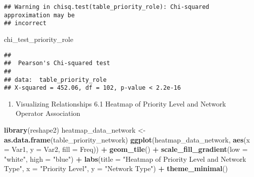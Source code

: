 \documentclass[
]{article}
\newenvironment{Shaded}{\begin{snugshade}}{\end{snugshade}}
\newcommand{\AttributeTok}[1]{\textcolor[rgb]{0.13,0.29,0.53}{#1}}
\newcommand{\CommentTok}[1]{\textcolor[rgb]{0.56,0.35,0.01}{\textit{#1}}}
\newcommand{\FunctionTok}[1]{\textcolor[rgb]{0.13,0.29,0.53}{\textbf{#1}}}
\newcommand{\NormalTok}[1]{#1}
\newcommand{\OtherTok}[1]{\textcolor[rgb]{0.56,0.35,0.01}{#1}}
\newcommand{\SpecialCharTok}[1]{\textcolor[rgb]{0.81,0.36,0.00}{\textbf{#1}}}
\newcommand{\StringTok}[1]{\textcolor[rgb]{0.31,0.60,0.02}{#1}}
\providecommand{\tightlist}{%
  \setlength{\itemsep}{0pt}\setlength{\parskip}{0pt}}
\begin{document}
\begin{Shaded}
\end{Shaded}

\begin{verbatim}
## Warning in chisq.test(table_priority_role): Chi-squared approximation may be
## incorrect
\end{verbatim}

\begin{Shaded}
\begin{Highlighting}[]
\NormalTok{chi\_test\_priority\_role}
\end{Highlighting}
\end{Shaded}

\begin{verbatim}
## 
##  Pearson's Chi-squared test
## 
## data:  table_priority_role
## X-squared = 452.06, df = 102, p-value < 2.2e-16
\end{verbatim}

\begin{enumerate}
\def\labelenumi{\arabic{enumi}.}
\setcounter{enumi}{5}
\tightlist
\item
  Visualizing Relationships 6.1 Heatmap of Priority Level and Network
  Operator Association
\end{enumerate}

\begin{Shaded}
\begin{Highlighting}[]
\FunctionTok{library}\NormalTok{(reshape2)}
\NormalTok{heatmap\_data\_network }\OtherTok{\textless{}{-}} \FunctionTok{as.data.frame}\NormalTok{(table\_priority\_network)}
\FunctionTok{ggplot}\NormalTok{(heatmap\_data\_network, }\FunctionTok{aes}\NormalTok{(}\AttributeTok{x =}\NormalTok{ Var1, }\AttributeTok{y =}\NormalTok{ Var2, }\AttributeTok{fill =}\NormalTok{ Freq)) }\SpecialCharTok{+}
  \FunctionTok{geom\_tile}\NormalTok{() }\SpecialCharTok{+}
  \FunctionTok{scale\_fill\_gradient}\NormalTok{(}\AttributeTok{low =} \StringTok{"white"}\NormalTok{, }\AttributeTok{high =} \StringTok{"blue"}\NormalTok{) }\SpecialCharTok{+}
  \FunctionTok{labs}\NormalTok{(}\AttributeTok{title =} \StringTok{"Heatmap of Priority Level and Network Type"}\NormalTok{, }\AttributeTok{x =} \StringTok{"Priority Level"}\NormalTok{, }\AttributeTok{y =} \StringTok{"Network Type"}\NormalTok{) }\SpecialCharTok{+}
  \FunctionTok{theme\_minimal}\NormalTok{()}
\end{Highlighting}
\end{Shaded}
\end{document}
